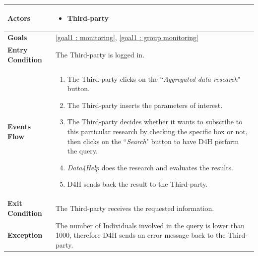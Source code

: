             \begin{table}[H]
            	\centering
                \begin{tabular}{|p{3cm}|p{8.2cm}|}
                    \hline
                    \textbf{Actors} &  \begin{itemize}
                        \item Third-party
                    \end{itemize} \\
                     \hline
                    \textbf{Goals} & \ref{goal1 : monitoring}, \ref{goal1 : group monitoring}\\ 
                     \hline
                    \textbf{Entry Condition} & The Third-party is logged in. \\
                     \hline
                    \textbf{Events Flow} & \begin{enumerate}
                        \item The Third-party clicks on the ``\emph{Aggregated data research}" button.
                        \item The Third-party inserts the parameters of interest.
                        \item The Third-party decides whether it wants to subscribe to this particular research by checking the specific box or not, then clicks on the ``\emph{Search}" button to have D4H perform the query.
                        \item \emph{Data4Help} does the research and evaluates the results.
                        \item D4H sends back the result to the Third-party.
                    \end{enumerate} \\
                     \hline
                    \textbf{Exit Condition} & The Third-party receives the requested information. \\
                     \hline
                    \textbf{Exception} & The number of Individuals involved in the query is lower                        than 1000, therefore D4H sends an error message back to the                      Third-party. \\
                     \hline
                \end{tabular}  
            \end{table}
            
